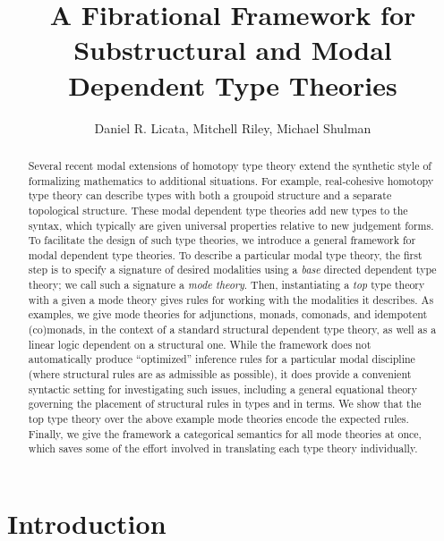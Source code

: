 \documentclass[10pt]{article}
\title{A Fibrational Framework for \\ Substructural and Modal Dependent Type Theories}
\author{Daniel R. Licata, Mitchell Riley, Michael Shulman}
\date{}
\theoremstyle{definition}
\begin{document}
\maketitle

\begin{abstract}
Several recent modal extensions of homotopy type theory extend the
synthetic style of formalizing mathematics to additional situations.
For example, real-cohesive homotopy type theory can describe types with
both a groupoid structure and a separate topological structure.  These
modal dependent type theories add new types to the syntax, which
typically are given universal properties relative to new judgement
forms.  To facilitate the design of such type theories, we introduce a
general framework for modal dependent type theories.  To describe a
particular modal type theory, the first step is to specify a signature
of desired modalities using a \emph{base} directed dependent type
theory; we call such a signature a \emph{mode theory}.  Then,
instantiating a \emph{top} type theory with a given a mode theory gives
rules for working with the modalities it describes.  As examples, we
give mode theories for adjunctions, monads, comonads, and idempotent
(co)monads, in the context of a standard structural dependent type
theory, as well as a linear logic dependent on a structural one.  While
the framework does not automatically produce ``optimized'' inference
rules for a particular modal discipline (where structural rules are as
admissible as possible), it does provide a convenient syntactic setting
for investigating such issues, including a general equational theory
governing the placement of structural rules in types and in terms.  We
show that the top type theory over the above example mode theories
encode the expected rules.  Finally, we give the framework a categorical
semantics for all mode theories at once, which saves some of the effort
involved in translating each type theory individually.
\end{abstract}

\tableofcontents

\section{Introduction}

\end{document}
